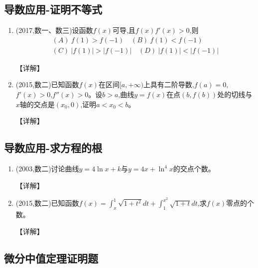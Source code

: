 \documentclass[12pt, a4paper, oneside, UTF8]{ctexbook}
\begin{document}
\subsection{导数应用-证明不等式}

\begin{enumerate}[label=\arabic*.,start=21]
    \item  (2017,数一、数三)设函数$f(x)$可导,且$f(x)f'(x)>0$,则
    \begin{align*}
        (A)\ f(1)>f(-1) \quad (B)\ f(1)<f(-1) \\
        (C)\ |f(1)|>|f(-1)| \quad (D)\ |f(1)|<|f(-1)|
    \end{align*}
    
    \begin{solution}
    【详解】
    \end{solution}
    
    \item  (2015,数二)已知函数$f(x)$在区间$[a,+\infty)$上具有二阶导数,$f(a)=0$,$f'(x)>0$,$f''(x)>0$。设$b>a$,曲线$y=f(x)$在点$(b,f(b))$处的切线与$x$轴的交点是$(x_0,0)$,证明$a<x_0<b$。
    
    \begin{solution}
    【详解】
    \end{solution}
\end{enumerate}

\subsection{导数应用-求方程的根}

\begin{enumerate}[label=\arabic*.,start=23]
    \item  (2003,数二)讨论曲线$y=4\ln x+k$与$y=4x+\ln^4 x$的交点个数。
    
    \begin{solution}
    【详解】
    \end{solution}
    
    \item  (2015,数二)已知函数$f(x)=\int_x^1\sqrt{1+t^2}dt+\int_1^{x^2}\sqrt{1+t}dt$,求$f(x)$零点的个数。
    
    \begin{solution}
    【详解】
    \end{solution}
\end{enumerate}

\subsection{微分中值定理证明题}
\end{document}
